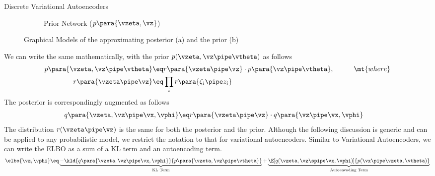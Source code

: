 \documentclass{article}
\newcommand{\pp}{p\para}
\newcommand{\qp}{q\para}
\begin{document}
\begin{psection}{Discrete Variational Autoencoders}
\begin{figure}[htpb]
\begin{subfigure}[b]{0.5\textwidth}
			\caption{Prior Network ($\pp{\vzeta, \vz}$)}
			\label{fig:dvae-network:prior}
		\end{subfigure}
		\caption{Graphical Models of the approximating posterior (a) and the prior (b)}
		\label{fig:dvae-network}
	\end{figure}

	We can write the same mathematically, with the prior $p(\vzeta, \vz \pipe \vtheta)$ as follows
	\begin{align}
		\pp{\vzeta, \vz \pipe \vtheta}	&\eq r\para{\vzeta \pipe \vz} \cdot \pp{\vz \pipe \vtheta}, \hspace{1cm}\mt{where}
		\label{eq:dvae-prior} \\
		r\para{\vzeta \pipe \vz}			&\eq \prod_i r\para{\zeta_i \pipe z_i} \nonumber
	\end{align}
	The posterior is correspondingly augmented as follows
	\begin{align}
		\qp{\vzeta, \vz \pipe \vx, \vphi}	&\eq	r\para{\vzeta \pipe \vz} \cdot \qp{\vz \pipe \vx, \vphi}
		\label{eq:dvae-post}
	\end{align}
	The distribution $r(\vzeta \pipe \vz)$ is the same for both the posterior and the prior. Although the following discussion is generic and can be applied to any probabilistic model, we restrict the notation to that for variational autoencoders. Similar to Variational Autoencoders, we can write the ELBO as a sum of a KL term and an autoencoding term.
	\begin{align}
		\elbo{\vz, \vphi} \eq \underbrace{- \kld{\qp{\vzeta, \vz \pipe \vx, \vphi}}{\pp{\vzeta, \vz \pipe \vtheta}}}_\text{KL Term} + \underbrace{\E[q(\vzeta, \vz \spipe \vx, \vphi)]{p(\vx \pipe \vzeta, \vtheta)}}_\text{Autoencoding Term}
		\label{eq:elbo-division}
	\end{align}


\end{psection}
\end{document}
